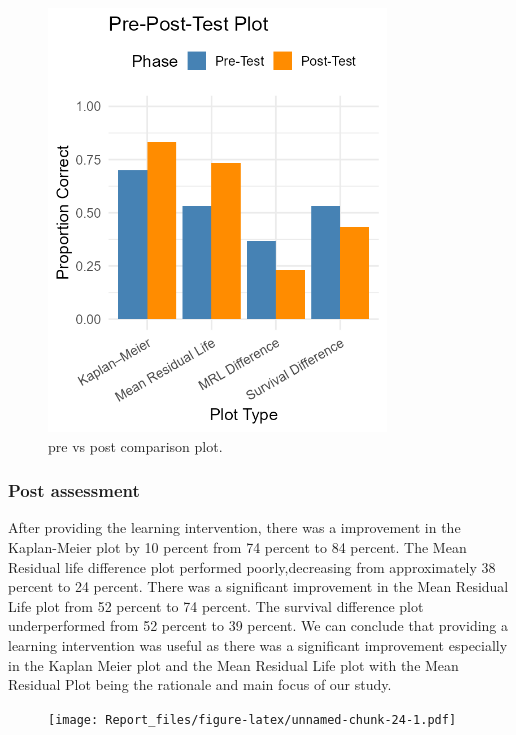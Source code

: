 \documentclass{article}
\newcommand{\pandocbounded}[1]{\begin{figure}[H]#1\end{figure}}
\begin{document}
\begin{figure}[H]
  \centering
  \includegraphics[width=0.8\textwidth]{pre_post_comparison.png}
  \caption{pre vs post comparison plot.}
  \label{fig:pre_post_comparison.png}
\end{figure}

\subsubsection{Post assessment}\label{post-assessment}

After providing the learning intervention, there was a improvement in the Kaplan-Meier plot by 10 percent from 74 percent to 84 percent. The Mean Residual life difference plot performed poorly,decreasing from approximately 38 percent to 24 percent. There was a significant improvement in the Mean Residual Life plot from 52 percent to 74 percent. The survival difference plot underperformed from 52 percent to 39 percent. We can conclude that providing a learning intervention was useful as there was a significant improvement especially in the Kaplan Meier plot and the Mean Residual Life plot with the Mean Residual Plot being the rationale and main focus of our study.

\pandocbounded{\texttt{[image: Report\_files/figure-latex/unnamed-chunk-24-1.pdf]}}
\end{document}
